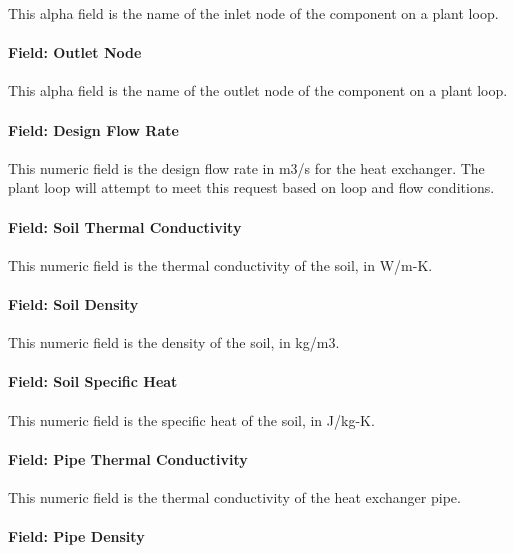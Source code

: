 This alpha field is the name of the inlet node of the component on a plant loop.

\paragraph{Field: Outlet Node}\label{field-outlet-node}

This alpha field is the name of the outlet node of the component on a plant loop.

\paragraph{Field: Design Flow Rate}\label{field-design-flow-rate-1-000}

This numeric field is the design flow rate in m3/s for the heat exchanger. The plant loop will attempt to meet this request based on loop and flow conditions.

\paragraph{Field: Soil Thermal Conductivity}\label{field-soil-thermal-conductivity}

This numeric field is the thermal conductivity of the soil, in W/m-K.

\paragraph{Field: Soil Density}\label{field-soil-density}

This numeric field is the density of the soil, in kg/m3.

\paragraph{Field: Soil Specific Heat}\label{field-soil-specific-heat}

This numeric field is the specific heat of the soil, in J/kg-K.

\paragraph{Field: Pipe Thermal Conductivity}\label{field-pipe-thermal-conductivity-1}

This numeric field is the thermal conductivity of the heat exchanger pipe.

\paragraph{Field: Pipe Density}\label{field-pipe-density}

